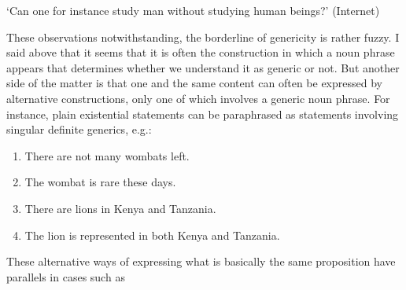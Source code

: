 ‘Can one for instance study man without studying human beings?’ (Internet)
\z


These observations notwithstanding, the borderline of genericity is rather fuzzy. I said above that it seems that it is often the construction in which a noun phrase appears that determines whether we understand it as generic or not. But another side of the matter is that one and the same content can often be expressed by alternative constructions, only one of which involves a generic noun phrase. For instance, plain existential statements can be paraphrased as statements involving singular definite generics, e.g.:

\begin{enumerate} %
\item 
There are not many wombats left.

\item 
The wombat is rare these days.

\item 
There are lions in Kenya and Tanzania.

\item 
The lion is represented in both Kenya and Tanzania. 

\end{enumerate} %
These alternative ways of expressing what is basically the same proposition have parallels in cases such as

